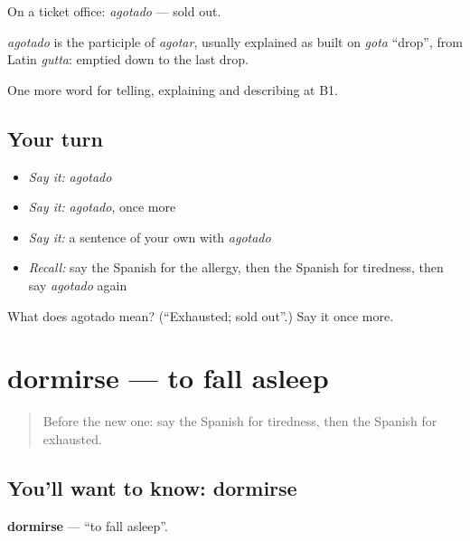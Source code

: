 On a ticket office: \emph{agotado} — sold out.

\begin{cousinweb}
\emph{agotado} is the participle of \emph{agotar}, usually explained as built on \emph{gota} \textquotedblleft{}drop\textquotedblright{}, from Latin \emph{gutta}: emptied down to the last drop.
\end{cousinweb}

\begin{grammarlens}[title={What you've built}]
One more word for telling, explaining and describing at B1.
\end{grammarlens}

\subsection*{Your turn}
\begin{itemize}
\raggedright
  \item \emph{Say it:} \emph{agotado}
  \item \emph{Say it:} \emph{agotado}, once more
  \item \emph{Say it:} a sentence of your own with \emph{agotado}
  \item \emph{Recall:} say the Spanish for the allergy, then the Spanish for tiredness, then say \emph{agotado} again
\end{itemize}

\begin{tcolorbox}[breakable,colback=teal!4,colframe=teal!35!black,title={Before you move on}]
What does agotado mean? (\textquotedblleft{}Exhausted; sold out\textquotedblright{}.) Say it once more.
\end{tcolorbox}
\section[dormirse]{dormirse — to fall asleep}

\label{lesson:ES-C741-dormirse}



\begin{quote}
Before the new one: say the Spanish for tiredness, then the Spanish for exhausted.
\end{quote}

\subsection*{You'll want to know: dormirse}
\textbf{dormirse} — \textquotedblleft{}to fall asleep\textquotedblright{}.

